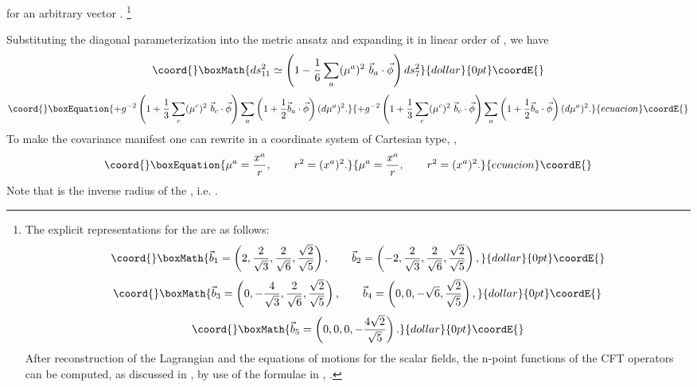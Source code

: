 \documentclass[a4paper,11pt]{article}
\begin{document}
for an arbitrary vector \coordHE{}. \footnote{The explicit
representations for the \coordHE{}  are as follows:
$$\coord{}\boxMath{
\vec{b}_1=\left( 2,{2\over \sqrt{3}},{2\over \sqrt{6}},
{\sqrt{2}\over \sqrt{5}}\right),\qquad
\vec{b}_2=\left( -2,{2\over \sqrt{3}},{2\over \sqrt{6}},
{\sqrt{2}\over \sqrt{5}}\right),
}{dollar}{0pt}\coordE{}$$  $$\coord{}\boxMath{
\vec{b}_3=\left( 0,-{4\over \sqrt{3}},{2\over \sqrt{6}},
{\sqrt{2}\over \sqrt{5}}\right),\qquad \vec{b}_4=\left(
0,0,-\sqrt{6}, {\sqrt{2}\over \sqrt{5}}\right),
}{dollar}{0pt}\coordE{}$$  $$\coord{}\boxMath{
\vec{b}_5=\left( 0,0,0,-{4\sqrt{2}\over \sqrt{5}}\right).
}{dollar}{0pt}\coordE{}$$
After reconstruction of the Lagrangian and the equations of
motions for the scalar fields, the n-point functions of the CFT
operators can be computed, as discussed in \cite{tran}, by use of
the formulae in \cite{fmmr}, \cite{mv}.}

Substituting the diagonal parameterization  into the
metric ansatz  and expanding it in linear order of
\myHighlight{$\vec{\phi}$}\coordHE{}, we have
$$\coord{}\boxMath{
ds^2_{11} \simeq \left(1-{1\over 6}\sum_a (\m^a)^2~\vec{b}_a\cdot
\vec{\phi} \right) ds^2_7
}{dollar}{0pt}\coordE{}$$
\begin{equation}\coord{}\boxEquation{\plabel{ansexp}
+g^{-2}\left( 1+{1\over 3}\sum_c (\m^c)^2~\vec{b}_c \cdot \vec{\phi}\right)
\sum_a \left(1+{1\over 2}\vec{b}_a\cdot \vec{\phi}\right)(d\m^a)^2.
}{+g^{-2}\left( 1+{1\over 3}\sum_c (\m^c)^2~\vec{b}_c \cdot \vec{\phi}\right)
\sum_a \left(1+{1\over 2}\vec{b}_a\cdot \vec{\phi}\right)(d\m^a)^2.
}{ecuacion}\coordE{}\end{equation}
To make the \coordHE{} covariance manifest one can rewrite  in
a coordinate system of Cartesian type, \coordHE{},
\begin{equation}\coord{}\boxEquation{\plabel{cart}
\mu^a={x^a\over r}, \qquad r^2=(x^a)^2.
}{\mu^a={x^a\over r}, \qquad r^2=(x^a)^2.
}{ecuacion}\coordE{}\end{equation}
Note that \coordHE{} is the inverse radius of the \coordHE{}, i.e. \coordHE{}.
\end{document}
